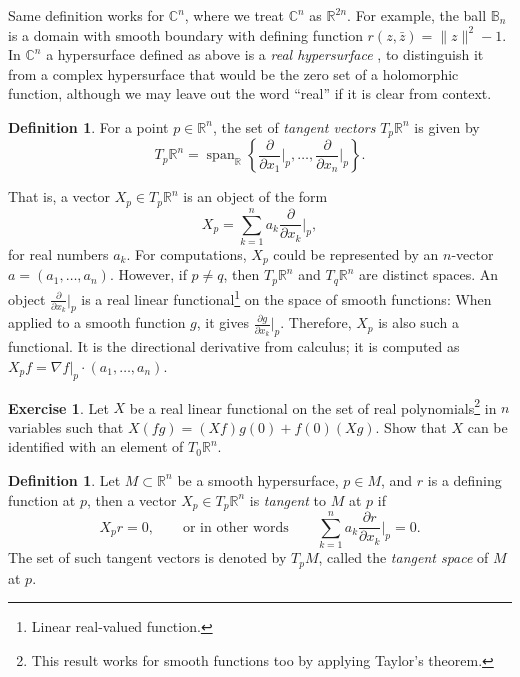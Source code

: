 \documentclass[12pt,openany]{book}
\newcommand{\snorm}[1]{\lVert {#1} \rVert}
\newcommand{\C}{{\mathbb{C}}}
\newcommand{\R}{{\mathbb{R}}}
\newcommand{\bB}{{\mathbb{B}}}
\newcommand{\myindex}[1]{#1\index{#1}}
\theoremstyle{plain}
\theoremstyle{remark}
\theoremstyle{definition}
\newtheorem{defn}[thm]{Definition}
\newenvironment{exbox}{%
    \def\FrameCommand{\vrule width 1pt \relax\hspace{10pt}}%
    \MakeFramed{\advance\hsize-\width\FrameRestore}%
}{%
    \endMakeFramed
}
\theoremstyle{exercise}
\newtheorem{exercise}{Exercise}[section]
\theoremstyle{example}
\begin{document}
Same definition works for $\C^n$, where we treat $\C^n$ as $\R^{2n}$.
For example, the ball $\bB_n$ is a domain with smooth boundary with defining
function $r(z,\bar{z}) = \snorm{z}^2-1$.
In $\C^n$
a hypersurface defined as above is a \emph{\myindex{real hypersurface}}%
,
to distinguish it from a complex hypersurface that would be the zero set of
a holomorphic function, although we may leave out the word ``real''
if it is clear from context.

\begin{defn}
For a point $p \in \R^n$, the set of \emph{tangent vectors} $T_p \R^n$ is given by
%
\begin{equation*}
T_p \R^n = \operatorname{span}_{\R} \left\{
\frac{\partial}{\partial x_1}\Big|_p,
\ldots,
\frac{\partial}{\partial x_n}\Big|_p \right\} .
\end{equation*}
\end{defn}

That is, a vector $X_p \in T_p \R^n$ is an object of the form
\begin{equation*}
X_p = \sum_{k=1}^n a_k
\frac{\partial}{\partial x_k}\Big|_p ,
\end{equation*}
for real numbers $a_k$.  For computations, $X_p$ could be represented
by an $n$-vector $a = (a_1,\ldots,a_n)$.  However, if $p \not= q$, then
$T_p \R^n$ and
$T_q \R^n$ are distinct spaces.
%
An object
$\frac{\partial}{\partial x_k}\big|_p$
is a real linear functional\footnote{Linear real-valued function.}
on the space of smooth functions:
When applied to a smooth function $g$, it gives
$\frac{\partial g}{\partial x_k} \big|_p$.  Therefore, $X_p$ is also such a
functional.  It is the directional derivative from calculus;
it is computed as $X_p f = \nabla f|_p \cdot (a_1,\ldots,a_n)$.

\begin{savenotes}
\begin{exbox}
\begin{exercise}
Let $X$ be a real linear functional on the set of real
polynomials\footnote{This result works for smooth functions too
by applying Taylor's theorem.} in $n$ variables
such that $X (fg) = (Xf) g(0) + f(0) (Xg)$.  Show that $X$
can be identified with an element of $T_0 \R^n$.
\end{exercise}
\end{exbox}
\end{savenotes}


\begin{defn}
Let $M \subset \R^n$ be a smooth hypersurface,
$p \in M$, and $r$ is a defining function at $p$,
then a vector $X_p \in T_p \R^n$ is \emph{tangent}
to $M$ at $p$ if
\begin{equation*}
X_p r = 0, \qquad \text{or in other words} \qquad
\sum_{k=1}^n a_k \frac{\partial r}{\partial x_k} \Big|_p = 0 .
\end{equation*}
%
The set of such tangent vectors is denoted by $T_p M$,
called the \emph{\myindex{tangent space}} of $M$ at $p$.
\end{defn}
\end{document}
